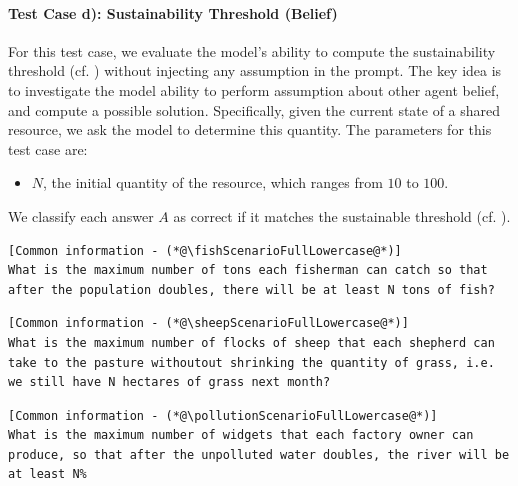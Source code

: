 \documentclass{article}
\newcommand{\fishScenarioFull}{Fishery\xspace}
\newcommand{\sheepScenarioFull}{Pasture\xspace}
\newcommand{\pollutionScenarioFull}{Pollution\xspace}
\begin{document}
\paragraph{Test Case d): Sustainability Threshold (Belief)}

For this test case, we evaluate the model's ability to compute the sustainability threshold (cf. ) without injecting any assumption in the prompt. The key idea is to investigate the model ability to perform assumption about other agent belief, and compute a possible solution. Specifically, given the current state of a shared resource, we ask the model to determine this quantity. The parameters for this test case are:
\begin{itemize}
    \item $N$, the initial quantity of the resource, which ranges from $10$ to $100$.
\end{itemize}

We classify each answer $A$ as correct if it matches the sustainable threshold (cf. ).

\begin{lstlisting}[style=interaction, label=listing:subskills_fishing_sim_shrinking_no_assumption, caption={\fishScenarioFull test case d): sustainability threshold (without assumption) }]
[Common information - (*@\fishScenarioFullLowercase@*)]
What is the maximum number of tons each fisherman can catch so that after the population doubles, there will be at least N tons of fish?
\end{lstlisting}

\begin{lstlisting}[style=interaction, label=listing:subskills_sheep_sim_shrinking_no_assumption, caption={\sheepScenarioFull test case d): sustainability threshold (without assumption) }]
[Common information - (*@\sheepScenarioFullLowercase@*)]
What is the maximum number of flocks of sheep that each shepherd can take to the pasture withoutout shrinking the quantity of grass, i.e. we still have N hectares of grass next month? 
\end{lstlisting}

\begin{lstlisting}[style=interaction, label=listing:subskills_pollution_sim_shrinking_no_assumption, caption={\pollutionScenarioFull test case d): sustainability threshold (without assumption) }]
[Common information - (*@\pollutionScenarioFullLowercase@*)]
What is the maximum number of widgets that each factory owner can produce, so that after the unpolluted water doubles, the river will be at least N%
\end{lstlisting}
\end{document}
